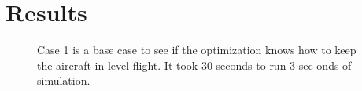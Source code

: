 \documentclass[letterpaper, 10 pt, conference]{ieeeconf}  %
\begin{document}


\section{Results}


\begin{figure}[htbp]
	\centering
	\qquad
	\caption{Case 1 is a base case to see if the optimization knows how to keep the aircraft in level flight. It took 30 seconds to run 3 sec 	onds of simulation.}
	\label{fig:fw_level}
\end{figure}
\end{document}
